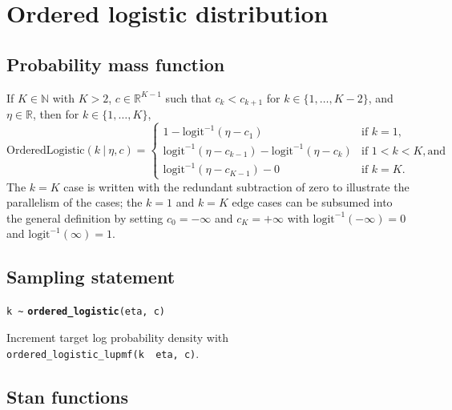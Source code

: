 \documentclass[
  10pt,
]{book}
\begin{document}
\hypertarget{ordered-logistic-distribution}{%
\section{Ordered logistic distribution}\label{ordered-logistic-distribution}}

\hypertarget{probability-mass-function-7}{%
\subsection{Probability mass function}\label{probability-mass-function-7}}

If \(K \in \mathbb{N}\) with \(K > 2\), \(c \in \mathbb{R}^{K-1}\) such that
\(c_k < c_{k+1}\) for \(k \in \{1,\ldots,K-2\}\), and \(\eta \in \mathbb{R}\), then for \(k \in \{1,\ldots,K\}\), \[
\text{OrderedLogistic}(k~|~\eta,c) = \left\{ \begin{array}{ll} 1 -
\text{logit}^{-1}(\eta - c_1)  &  \text{if } k = 1, \\[4pt]
\text{logit}^{-1}(\eta - c_{k-1}) - \text{logit}^{-1}(\eta - c_{k})  &
\text{if } 1 < k < K, \text{and} \\[4pt] \text{logit}^{-1}(\eta -
c_{K-1}) - 0  &  \text{if } k = K. \end{array} \right. \] The \(k=K\)
case is written with the redundant subtraction of zero to illustrate
the parallelism of the cases; the \(k=1\) and \(k=K\) edge cases can be
subsumed into the general definition by setting \(c_0 = -\infty\) and
\(c_K = +\infty\) with \(\text{logit}^{-1}(-\infty) = 0\) and
\(\text{logit}^{-1}(\infty) = 1\).

\hypertarget{sampling-statement-10}{%
\subsection{Sampling statement}\label{sampling-statement-10}}

\texttt{k\ \textasciitilde{}} \textbf{\texttt{ordered\_logistic}}\texttt{(eta,\ c)}

Increment target log probability density with \texttt{ordered\_logistic\_lupmf(k\ \textbar{}\ eta,\ c)}.

\hypertarget{stan-functions-9}{%
\subsection{Stan functions}\label{stan-functions-9}}
\end{document}
